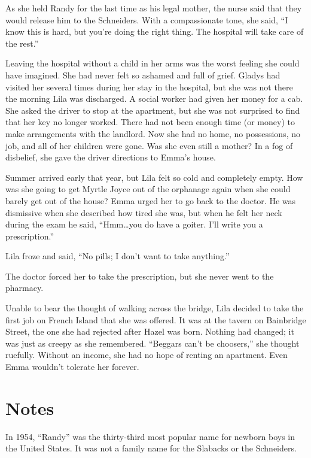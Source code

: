 \documentclass[
  american,
  letterpaper,
]{book}
\begin{document}
As she held Randy for the last time as his legal mother, the nurse said
that they would release him to the Schneiders. With a compassionate
tone, she said, ``I know this is hard, but you're doing the right thing.
The hospital will take care of the rest.''

Leaving the hospital without a child in her arms was the worst feeling
she could have imagined. She had never felt so ashamed and full of
grief. Gladys had visited her several times during her stay in the
hospital, but she was not there the morning Lila was discharged. A
social worker had given her money for a cab. She asked the driver to
stop at the apartment, but she was not surprised to find that her key no
longer worked. There had not been enough time (or money) to make
arrangements with the landlord. Now she had no home, no possessions, no
job, and all of her children were gone. Was she even still a mother? In
a fog of disbelief, she gave the driver directions to Emma's house.

Summer arrived early that year, but Lila felt so cold and completely
empty. How was she going to get Myrtle Joyce out of the orphanage again
when she could barely get out of the house? Emma urged her to go back to
the doctor. He was dismissive when she described how tired she was, but
when he felt her neck during the exam he said, ``Hmm\ldots you do have a
goiter. I'll write you a prescription.''

Lila froze and said, ``No pills; I don't want to take anything.''

The doctor forced her to take the prescription, but she never went to
the pharmacy.

Unable to bear the thought of walking across the bridge, Lila decided to
take the first job on French Island that she was offered. It was at the
tavern on Bainbridge Street, the one she had rejected after Hazel was
born. Nothing had changed; it was just as creepy as she remembered.
``Beggars can't be choosers,'' she thought ruefully. Without an income,
she had no hope of renting an apartment. Even Emma wouldn't tolerate her
forever.

\section{Notes}\label{notes-57}

In 1954, ``Randy'' was the thirty-third most popular name for newborn
boys in the United States. It was not a family name for the Slabacks or
the Schneiders.
\end{document}
